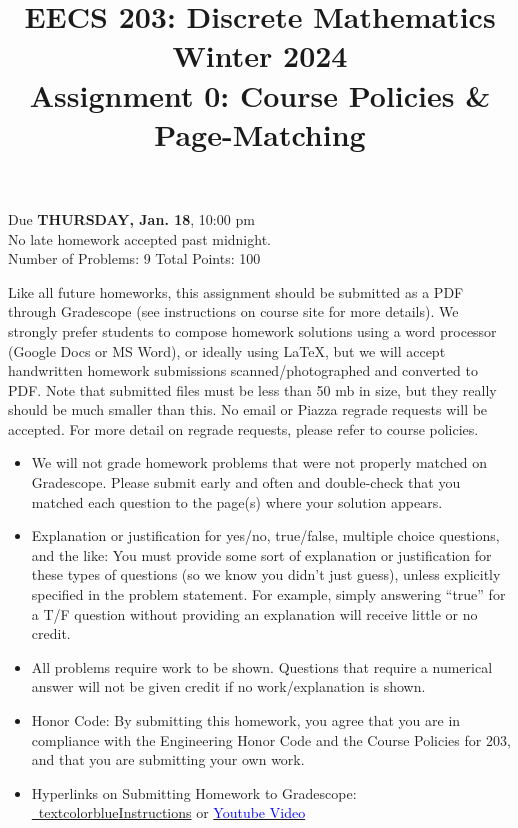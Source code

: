 \documentclass[12pt]{exam}
\begin{document}
\title{EECS 203: Discrete Mathematics\\
Winter 2024\\
Assignment 0: Course Policies \& Page-Matching}
\date{}
\author{}
\maketitle
\vspace{-50pt}
\begin{center}
\huge Due \textbf{THURSDAY, Jan. 18}, 10:00 pm\\
\Large No late homework accepted past midnight.\\
\vspace{10pt}
\large Number of Problems: 9
\hspace{3cm}
Total Points: 100
\end{center}
\vspace{25pt}
Like all future homeworks, this assignment should be submitted as a PDF through
Gradescope (see instructions on course site for more details). We strongly prefer
students to compose homework solutions using a word processor (Google Docs or MS
Word), or ideally using \LaTeX, but we will accept handwritten homework submissions
scanned/photographed and converted to PDF. Note that submitted files must be less
than 50 mb in size, but they really should be much smaller than this. No email or
Piazza regrade requests will be accepted. For more detail on regrade requests,
please refer to course policies.
\begin{itemize}
\item We will not grade homework problems that were not properly matched on
Gradescope. Please submit early and often and double-check that you matched each
question to the page(s) where your solution appears.
\item Explanation or justification for yes/no, true/false, multiple choice
questions, and the like: You must provide some sort of explanation or justification
for these types of questions (so we know you didn’t just guess), unless explicitly
specified in the problem statement. For example, simply answering “true” for a T/F
question without providing an explanation will receive little or no credit.
\item All problems require work to be shown. Questions that require a numerical
answer will not be given credit if no work/explanation is shown.
\item Honor Code: By submitting this homework, you agree that you are in
compliance with the Engineering Honor Code and the Course Policies for 203, and
that you are submitting your own work.
\item Hyperlinks on Submitting Homework to Gradescope:
\href{https://www.gradescope.com/help#help-center-item-student-submitting}{\
textcolor{blue}{Instructions}} or
\href{https://youtu.be/KMPoby5g_nE}{\textcolor{blue}{Youtube Video}}
\end{itemize}
\newpage
\end{document}
